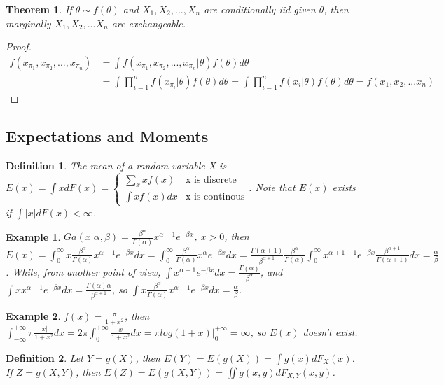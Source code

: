\documentclass[11pt]{article}
\newtheorem{theorem}{Theorem}[section]
\newtheorem{definition}{Definition}[section]
\newtheorem{example}{Example}[section]
\begin{document}
\begin{theorem}
If $\theta \sim f(\theta)$ and $X_1, X_2, ..., X_n$ are conditionally iid given $\theta$, then marginally $X_1, X_2, ... X_n$ are exchangeable.
\end{theorem}
\begin{proof}
\[
\begin{aligned}
f(x_{\pi_1}, x_{\pi_2}, ..., x_{\pi_n})&=\int f(x_{\pi_1}, x_{\pi_2}, ..., x_{\pi_n}|\theta)f(\theta)d\theta \\
&=\int\prod_{i=1}^nf(x_{\pi_i}|\theta)f(\theta)d\theta=\int\prod_{i=1}^nf(x_i|\theta)f(\theta)d\theta=f(x_1, x_2, ... x_n)
\end{aligned}
\]
\end{proof}
\subsection{Expectations and Moments}
\begin{definition}
The mean of a random variable X is $E(x)=\int xdF(x)=\begin{cases}\sum\limits_xxf(x)  & \text{x is discrete} \\ \int xf(x)dx & \text{x is continous} \end{cases}$. Note that $E(x)$ exists if $\int|x|dF(x)<\infty$.
\end{definition}
\begin{example}
$Ga(x|\alpha,\beta)=\frac{\beta^{\alpha}}{\Gamma(\alpha)}x^{\alpha-1}e^{-\beta x}$, $x>0$, then 
$E(x)=\int_0^{\infty}x\frac{\beta^{\alpha}}{\Gamma(\alpha)}x^{\alpha-1}e^{-\beta x}dx=\int_0^{\infty}\frac{\beta^{\alpha}}{\Gamma(\alpha)}x^{\alpha}e^{-\beta x}dx=\frac{\Gamma(\alpha+1)}{\beta^{\alpha+1}}\frac{\beta^{\alpha}}{\Gamma(\alpha)}\int_0^{\infty}x^{\alpha+1-1}e^{-\beta x}\frac{\beta^{\alpha+1}}{\Gamma(\alpha+1)}dx=\frac{\alpha}{\beta}$. While, from another point of view, $\int x^{\alpha-1}e^{-\beta x}dx=\frac{\Gamma(\alpha)}{\beta^{\alpha}}$, and $\int xx^{\alpha-1}e^{-\beta x}dx=\frac{\Gamma(\alpha)\alpha}{\beta^{\alpha+1}}$, so $\int x\frac{\beta^{\alpha}}{\Gamma(\alpha)}x^{\alpha-1}e^{-\beta x}dx=\frac{\alpha}{\beta}$.
\end{example}
\begin{example}
$f(x)=\frac{\pi}{1+x^2}$, then $\int_{-\infty}^{+\infty}\pi \frac{|x|}{1+x^2}dx=2\pi\int_0^{+\infty}\frac{x}{1+x^2}dx=\pi log(1+x)|_0^{+\infty}=\infty$, so $E(x)$ doesn't exist.
\end{example}
\begin{definition}
Let $Y=g(X)$, then $E(Y)=E(g(X))=\int g(x)dF_X(x)$. If $Z=g(X,Y)$, then $E(Z)=E(g(X,Y))=\iint g(x,y)dF_{X,Y}(x,y)$.
\end{definition}
\end{document}
